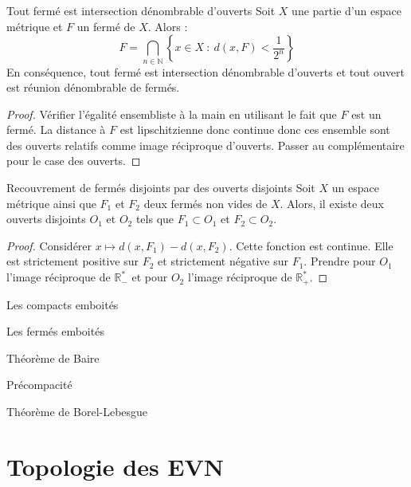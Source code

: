 \documentclass[french]{article}
\newcommand{\N}{\mathbb{N}}
\newcommand{\R}{\mathbb{R}}
\newcommand{\st}{^*}
\theoremstyle{definition}
\begin{document}
\begin{lem}{Tout fermé est intersection dénombrable d'ouverts}
	Soit $X$ une partie d'un espace métrique et $F$ un fermé de $X$. Alors : $$F=\bigcap_{n\in\N}\left\{x\in X\ : \ d(x,F)<\frac{1}{2^n}\right\}$$ En conséquence, tout fermé est intersection dénombrable d'ouverts et tout ouvert est réunion dénombrable de fermés.
\end{lem}
\begin{proof}
	Vérifier l'égalité ensembliste à la main en utilisant le fait que $F$ est un fermé. La distance à $F$ est lipschitzienne donc continue donc ces ensemble sont des ouverts relatifs comme image réciproque d'ouverts. Passer au complémentaire pour le case des ouverts.
\end{proof}

\begin{lem}{Recouvrement de fermés disjoints par des ouverts disjoints}
	Soit $X$ un espace métrique ainsi que $F_1$ et $F_2$ deux fermés non vides de $X$. Alors, il existe deux ouverts disjoints $O_1$ et $O_2$ tels que $F_1\subset O_1$ et $F_2\subset O_2$.
\end{lem}
\begin{proof}
	Considérer $x\mapsto d(x,F_1)-d(x,F_2)$. Cette fonction est continue. Elle est strictement positive sur $F_2$ et strictement négative sur $F_1$. Prendre pour $O_1$ l'image réciproque de $\R_-\st$ et pour $O_2$ l'image réciproque de $\R_+\st$.
\end{proof}

\begin{lem}{Les compacts emboités}
	
\end{lem}

\begin{lem}{Les fermés emboités}
	
\end{lem}

\begin{lem}{Théorème de Baire}
	
\end{lem}

\begin{lem}{Précompacité}
	
\end{lem}

\begin{lem}{Théorème de Borel-Lebesgue}
	
\end{lem}

\section{Topologie des EVN}
\end{document}
